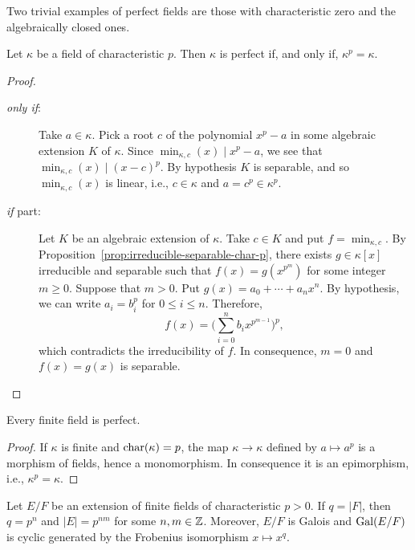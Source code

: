 \begin{xmpls}
    Two trivial examples of perfect fields are those with characteristic zero and the algebraically closed ones.
\end{xmpls}

\begin{thm}\label{thm:perfect-field-criterion}
    Let\/ $\kappa$ be a field of characteristic\/ $p$. Then\/ $\kappa$ is perfect if, and only if, $\kappa^p = \kappa$.
\end{thm}

\begin{proof}${}$
    \begin{description}
        \item[\rm\textit{only if\/}:] Take $a\in\kappa$. Pick a root $c$ of the polynomial $x^p-a$ in some algebraic extension $K$ of $\kappa$. Since $\min_{\kappa,c}(x)\mid x^p-a$, we see that $\min_{\kappa,c}(x)\mid(x-c)^p$. By hypothesis $K$ is separable, and so $\min_{\kappa,c}(x)$ is linear, i.e., $c\in\kappa$ and $a=c^p\in\kappa^p$.

        \item[\rm\textit{if\/} part:] Let $K$ be an algebraic extension of $\kappa$. Take $c\in K$ and put $f=\min_{\kappa,c}$. By Proposition~\ref{prop:irreducible-separable-char-p}, there exists $g\in\kappa[x]$ irreducible and separable such that $f(x)=g(x^{p^m})$ for some integer $m\ge0$. Suppose that $m>0$. Put $g(x)=a_0+\cdots+a_nx^n$. By hypothesis, we can write $a_i=b_i^p$ for $0\le i\le n$. Therefore,
        $$
            f(x) = \Big(\sum_{i=0}^nb_ix^{p^{m-1}}\Big)^p,
        $$
        which contradicts the irreducibility of $f$. In consequence, $m=0$ and $f(x)=g(x)$ is separable. \qedhere
    \end{description}
\end{proof}

\begin{cor}\label{cor:finite-implies-perfect}
    Every finite field is perfect.
\end{cor}

\begin{proof}
    If $\kappa$ is finite and $\operatorname{char}(\kappa)=p$, the map $\kappa\to\kappa$ defined by $a\mapsto a^p$ is a morphism of fields, hence a monomorphism. In consequence it is an epimorphism, i.e., $\kappa^p=\kappa$. 
\end{proof}

\begin{thm}
    Let\/ $E/F$ be an extension of finite fields of characteristic\/ $p>0$. If\/ $q=|F|$, then\/ $q=p^n$ and\/ $|E|=p^{nm}$ for some\/ $n,m\in\mathbb{Z}$. Moreover, $E/F$ is Galois and\/ $\operatorname{Gal}(E/F)$ is cyclic generated by the Frobenius isomorphism\/ $x\mapsto x^q$.
\end{thm}

